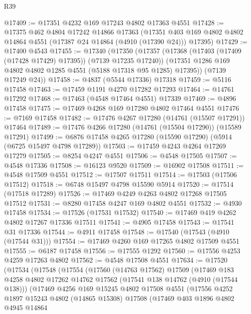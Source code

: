 \begin{lexlean}{R39}
\begin{coremodule}
@17409 := @17351 @4232 @169 @17243 @4802 @17363 @4551
@17428 := @17375
    @462
    @4804
    @17242
    @14866
    @17363
    (@17351 @403 @169 @4802 @4802 @14864 @4551 (@17387 @24 @14864 (@4910 (@17390 @24))) @17395)
@17429 := @17400 @4543
@17455 := @17340
    (@17350
      (@17357
        (@17368 (@17403 (@17409 (@17428 @17429) @17395)) (@7139 @17235 @17240))
        (@17351 @1286 @169 @4802 @4802 @1285 @4551 (@5188 @17318 @95 @1285) @17395))
      (@7139 @17249 @24))
@17458 := @4837 (@5544 @17336) @17318
@17459 := @5116 @17458
@17463 := @17459 @1191 @4270 @17282 @17293
@17464 := @14761 @17292
@17468 := @17463 (@4548 @17464 @4551) @17339
@17469 := @4896 @17458
@17475 := @17469 @4268 @169 @17280 @4802 @17464 @4551
@17476 := @7169 @17458
@17482 := @17476 @4267 @17280 (@14761 (@15507 @17291)) @17464
@17489 := @17476 @4266 @17280 (@14761 (@15504 @17290)) (@15589 @17291)
@17499 := @6876 @17458 @4265 @17280 (@15590 @17290) (@5914 (@6725 @15497 @4798 @17289))
@17503 := @17459 @4243 @4264 @17269 @17279
@17505 := @8254 @4247 @4551
@17506 := @4548 @17505
@17507 := @4548 @17336
@17508 := @16123 @9520
@17509 := @16902 @17508
@17511 := @4548 @17509 @4551
@17512 := @17507 @17511
@17514 := @17503 (@17506 @17512)
@17518 := @6748 @15497 @4798 @15590 @5914
@17520 := @17514 (@17518 @17289)
@17526 := @17469 @4249 @4263 @4802 @17268 @17505 @17512
@17531 := @8280 @17458 @4247 @169 @4802 @4551
@17532 := @4930 @17458
@17534 := @17526 (@17531 @17532)
@17540 := @17469 @419 @4262 @4802 @17267 @17336 @17511
@17541 := @4905 @17458
@17543 := @17541 @31 @17336
@17544 := @4911 @17458
@17548 := @17540 (@17543 (@4910 (@17544 @31)))
@17554 := @17469 @4260 @169 @17265 @4802 @17509 @4551
@17555 := @6187 @17458
@17556 := @17555 @1292
@17560 := @17556 @4253 @4259 @17263 @4802
@17562 := @4548 @17508 @4551
@17634 := @17520
    (@17534
      (@17548
        (@17554
          (@17560
            (@14763 @17562)
            @17509
            (@17469
              @183
              @4258
              @4802
              @17262
              @14762
              @17562
              (@17541 @138 @14762 (@4910 (@17544 @138)))
              (@17469
                @4256
                @169
                @15245
                @4802
                @17508
                @4551
                (@17556
                  @4252
                  @1897
                  @15243
                  @4802
                  (@14865 @15308)
                  @17508
                  (@17469
                    @403
                    @1896
                    @4802
                    @4945
                    @14864

\end{coremodule}
\end{lexlean}

